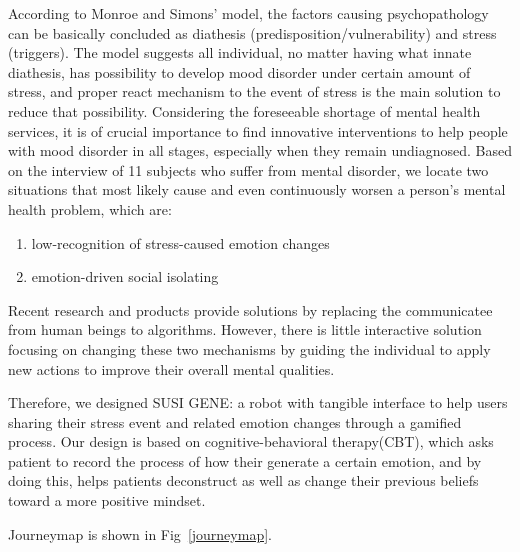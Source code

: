 \documentclass[manuscript,screen]{acmart}
\begin{document}
According to Monroe and Simons' model, the factors causing psychopathology can be basically concluded as diathesis (predisposition/vulnerability) and stress (triggers).\cite{monroe1991diathesis}
The model suggests all individual, no matter having what innate diathesis, has possibility to develop mood disorder under certain amount of stress, and proper react mechanism to the event of stress is the main solution to reduce that possibility. Considering the foreseeable shortage of mental health services, it is of crucial importance to find innovative interventions to help people with mood disorder in all stages, especially when they remain undiagnosed. Based on the interview of 11 subjects who suffer from mental disorder, we locate two situations that most likely cause and even continuously worsen a person’s mental health problem, which are:

\begin{enumerate}
  \item low-recognition of stress-caused emotion changes
  \item emotion-driven social isolating
\end{enumerate} 

Recent research and products provide solutions by replacing the communicatee from human beings to algorithms. However, there is little interactive solution focusing on changing these two mechanisms by guiding the individual to apply new actions to improve their overall mental qualities.

Therefore, we designed SUSI GENE: a robot with tangible interface to help users sharing their stress event and related emotion changes through a gamified process. Our design is based on cognitive-behavioral therapy(CBT), which asks patient to record the process of how their generate a certain emotion, and by doing this, helps patients deconstruct as well as change their previous beliefs toward a more positive mindset.

Journeymap is shown in Fig~\ref{journeymap}.
\end{document}
